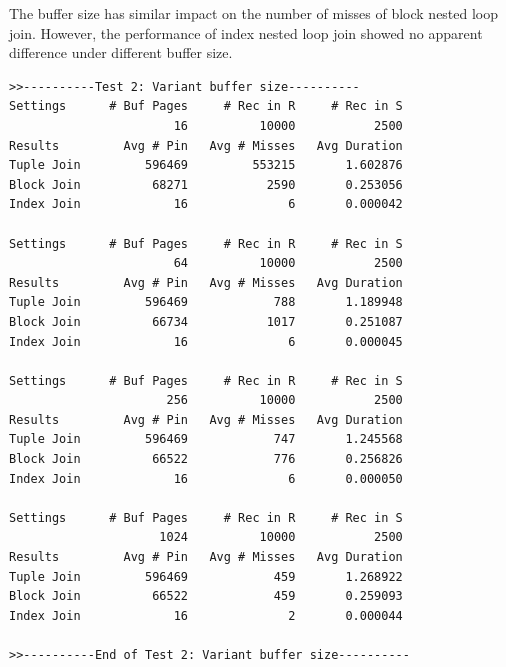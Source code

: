 \documentclass{article}
\begin{document}
The buffer size has similar impact on the number of misses of block nested loop join. However, the performance of index nested loop join showed no apparent difference under different buffer size.
\begin{center}
\begin{verbatim}
>>----------Test 2: Variant buffer size----------
Settings      # Buf Pages     # Rec in R     # Rec in S
                       16          10000           2500
Results         Avg # Pin   Avg # Misses   Avg Duration
Tuple Join         596469         553215       1.602876
Block Join          68271           2590       0.253056
Index Join             16              6       0.000042

Settings      # Buf Pages     # Rec in R     # Rec in S
                       64          10000           2500
Results         Avg # Pin   Avg # Misses   Avg Duration
Tuple Join         596469            788       1.189948
Block Join          66734           1017       0.251087
Index Join             16              6       0.000045

Settings      # Buf Pages     # Rec in R     # Rec in S
                      256          10000           2500
Results         Avg # Pin   Avg # Misses   Avg Duration
Tuple Join         596469            747       1.245568
Block Join          66522            776       0.256826
Index Join             16              6       0.000050

Settings      # Buf Pages     # Rec in R     # Rec in S
                     1024          10000           2500
Results         Avg # Pin   Avg # Misses   Avg Duration
Tuple Join         596469            459       1.268922
Block Join          66522            459       0.259093
Index Join             16              2       0.000044

>>----------End of Test 2: Variant buffer size----------
\end{verbatim}
\end{center}
\end{document}
